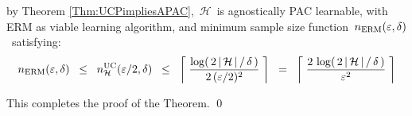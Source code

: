 \begin{enumerate}
	by Theorem \ref{Thm:UCPimpliesAPAC}, \,$\mathcal{H}$\, is
	agnostically PAC learnable, with ERM as viable learning algorithm, and
	minimum sample size function \,$n_{\textnormal{ERM}}(\varepsilon,\delta)$\,
	satisfying:
	\begin{equation*}
	n_{\textnormal{ERM}}(\varepsilon,\delta)
	\;\; \leq \;\;
		n^{\textnormal{UC}}_{\mathcal{H}}(\varepsilon/2,\delta)
	\;\; \leq \;\;
		\left\lceil\;
			\dfrac{
				\log\!\left(\,2\,\vert\,\mathcal{H}\,\vert\,/\,\delta\,\right)
				}{
				2\,(\varepsilon/2)^{2}
				}
			\;\right\rceil
	\;\; = \;\;
		\left\lceil\;
			\dfrac{
				2\,\log\!\left(\,2\,\vert\,\mathcal{H}\,\vert\,/\,\delta\,\right)
				}{
				\varepsilon^{2}
				}
			\;\right\rceil
	\end{equation*}
\end{enumerate}
This completes the proof of the Theorem.
\qed



